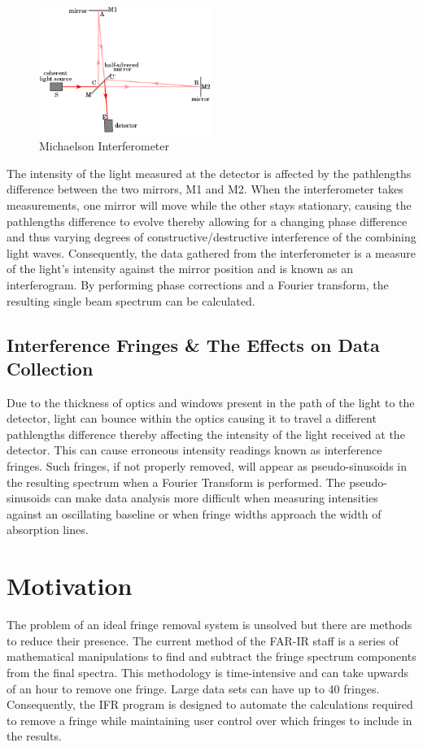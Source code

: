 \documentclass[a4paper, 12pt]{report}
\begin{document}
    \begin{figure}
        \centering
        \includegraphics[width=0.5\textwidth]{figures/Michelson_interferometer.png}
        \caption{Michaelson Interferometer}
        \label{fig:1}
    \end{figure}
    
    The intensity of the light measured at the detector is affected by the pathlengths difference between the two mirrors, M1 and M2. When the interferometer takes measurements, one mirror will move while the other stays stationary, causing the pathlengths difference to evolve thereby allowing for a changing phase difference and thus varying degrees of constructive/destructive interference of the combining light waves. Consequently, the data gathered from the interferometer is a measure of the light's intensity against the mirror position and is known as an interferogram. By performing phase corrections and a Fourier transform, the resulting single beam spectrum can be calculated.
    
    \subsection{Interference Fringes \& The Effects on Data Collection}
    
    Due to the thickness of optics and windows present in the path of the light to the detector, light can bounce within the optics causing it to travel a different pathlengths difference thereby affecting the intensity of the light received at the detector. This can cause erroneous intensity readings known as interference fringes. Such fringes, if not properly removed, will appear as pseudo-sinusoids in the resulting spectrum when a Fourier Transform is performed. The pseudo-sinusoids can make data analysis more difficult when measuring intensities against an oscillating baseline or when fringe widths approach the width of absorption lines.
    
    \section{Motivation}
    The problem of an ideal fringe removal system is unsolved but there are methods to reduce their presence. The current method of the FAR-IR staff is a series of mathematical manipulations to find and subtract the fringe spectrum components from the final spectra. This methodology is time-intensive and can take upwards of an hour to remove one fringe. Large data sets can have up to 40 fringes. Consequently, the IFR program is designed to automate the calculations required to remove a fringe while maintaining user control over which fringes to include in the results.
\end{document}
